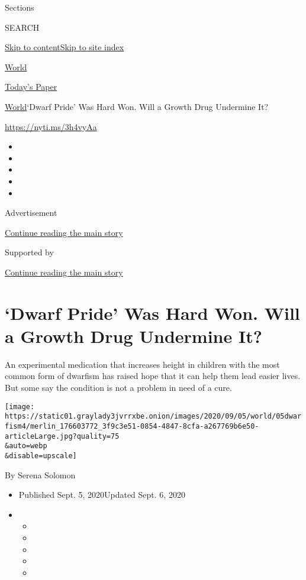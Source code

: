 Sections

SEARCH

\protect\hyperlink{site-content}{Skip to
content}\protect\hyperlink{site-index}{Skip to site index}

\href{https://www.nytimes3xbfgragh.onion/section/world}{World}

\href{https://myaccount.nytimes3xbfgragh.onion/auth/login?response_type=cookie\&client_id=vi}{}

\href{https://www.nytimes3xbfgragh.onion/section/todayspaper}{Today's
Paper}

\href{/section/world}{World}\textbar{}`Dwarf Pride' Was Hard Won. Will a
Growth Drug Undermine It?

\url{https://nyti.ms/3h4vyAa}

\begin{itemize}
\item
\item
\item
\item
\item
\end{itemize}

Advertisement

\protect\hyperlink{after-top}{Continue reading the main story}

Supported by

\protect\hyperlink{after-sponsor}{Continue reading the main story}

\hypertarget{dwarf-pride-was-hard-won-will-a-growth-drug-undermine-it}{%
\section{`Dwarf Pride' Was Hard Won. Will a Growth Drug Undermine
It?}\label{dwarf-pride-was-hard-won-will-a-growth-drug-undermine-it}}

An experimental medication that increases height in children with the
most common form of dwarfism has raised hope that it can help them lead
easier lives. But some say the condition is not a problem in need of a
cure.

\texttt{[image: https://static01.graylady3jvrrxbe.onion/images/2020/09/05/world/05dwarfism4/merlin\_176603772\_3f9c3e51-0854-4847-8cfa-a267769b6e50-articleLarge.jpg?quality=75\\\&auto=webp\\\&disable=upscale]}

By Serena Solomon

\begin{itemize}
\item
  Published Sept. 5, 2020Updated Sept. 6, 2020
\item
  \begin{itemize}
  \item
  \item
  \item
  \item
  \item
  \end{itemize}
\end{itemize}

